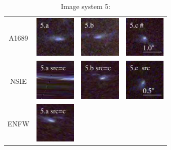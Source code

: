 \documentclass[useAMS,usenatbib]{mn2e}
\begin{document}
\begin{table}
  \caption{Image system 5:}\vspace{0mm}
  \begin{tabular}{cccc}
    \multicolumn{1}{m{1cm}}{{\Large A1689}}
    & \multicolumn{1}{m{1.7cm}}{\includegraphics[height=2.00cm,clip]{figs/nsie_img/rgb.img_5_a.ps}}
    & \multicolumn{1}{m{1.7cm}}{\includegraphics[height=2.00cm,clip]{figs/nsie_img/rgb.img_5_b.ps}}
    & \multicolumn{1}{m{1.7cm}}{\includegraphics[height=2.00cm,clip]{figs/nsie_img/rgb.img_5_c.ps}} \\
    \multicolumn{1}{m{1cm}}{{\Large NSIE}}
    & \multicolumn{1}{m{1.7cm}}{\includegraphics[height=2.00cm,clip]{figs/nsie_img/rgb.pre_5_a_c_tri.ps}}
    & \multicolumn{1}{m{1.7cm}}{\includegraphics[height=2.00cm,clip]{figs/nsie_img/rgb.pre_5_b_c_tri.ps}}
    & \multicolumn{1}{m{1.7cm}}{\includegraphics[height=2.00cm,clip]{figs/nsie_img/rgb.src_5_c.ps}} \\
    \multicolumn{1}{m{1cm}}{{\Large ENFW}}
    & \multicolumn{1}{m{1.7cm}}{\includegraphics[height=2.00cm,clip]{figs/enfw_img/rgb.pre_5_a_c_tri.ps}}

\end{tabular}
\end{table}
\end{document}

